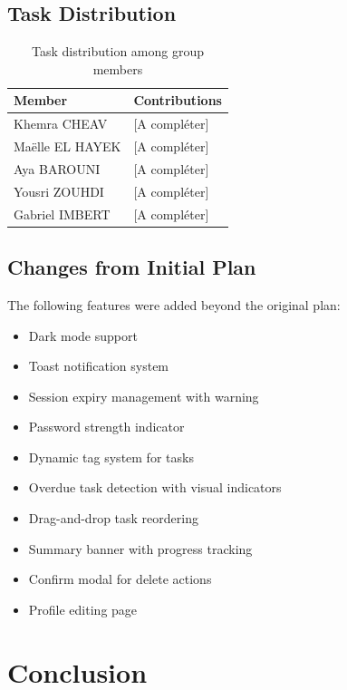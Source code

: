 \documentclass[12pt, a4paper]{article}
\begin{document}
\subsection{Task Distribution}

\begin{table}[H]
\centering
\begin{tabularx}{\textwidth}{lX}
\toprule
\textbf{Member} & \textbf{Contributions} \\
\midrule
Khemra CHEAV      & [A compl\'eter] \\
Ma\"elle EL HAYEK & [A compl\'eter] \\
Aya BAROUNI       & [A compl\'eter] \\
Yousri ZOUHDI     & [A compl\'eter] \\
Gabriel IMBERT    & [A compl\'eter] \\
\bottomrule
\end{tabularx}
\caption{Task distribution among group members}
\end{table}

\subsection{Changes from Initial Plan}

The following features were added beyond the original plan:
\begin{itemize}[nosep]
    \item Dark mode support
    \item Toast notification system
    \item Session expiry management with warning
    \item Password strength indicator
    \item Dynamic tag system for tasks
    \item Overdue task detection with visual indicators
    \item Drag-and-drop task reordering
    \item Summary banner with progress tracking
    \item Confirm modal for delete actions
    \item Profile editing page
\end{itemize}

\section{Conclusion}
\end{document}
